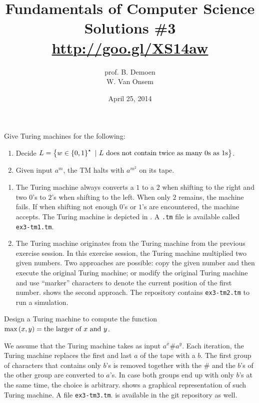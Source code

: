 \documentclass{article}
\title{Fundamentals of Computer Science\\Solutions \#3\\\url{http://goo.gl/XS14aw}}
\author{prof. B. Demoen\\W. Van Onsem}
\date{April 25, 2014}
\begin{document}
\maketitle
\begin{exercise}
Give Turing machines for the following:
\begin{enumerate}
 \item Decide $L=\left\{ w\in\left\{ 0,1 \right\}^{\star}\ |\ \mbox{$L$ does not contain twice as many $0$s as $1$s} \right\}$.
 \item Given input $a^m$, the TM halts with $a^{m^2}$ on its tape.
\end{enumerate}
\begin{answer}
\begin{enumerate}
 \item The Turing machine always converts a $1$ to a $2$ when shifting to the right and two $0$'s to $2$'s when shifting to the left. When only $2$ remains, the machine fails. If when shifting not enough $0$'s or $1$'s are encountered, the machine accepts. The Turing machine is depicted in . A \verb+.tm+ file is available called \verb+ex3-tm1.tm+.
 \item The Turing machine originates from the Turing machine from the previous exercise session. In this exercise session, the Turing machine multiplied two given numbers. Two approaches are possible: copy the given number and then execute the original Turing machine; or modify the original Turing machine and use ``marker'' characters to denote the current position of the first number.  shows the second approach. The repository contains \verb+ex3-tm2.tm+ to run a simulation.
\end{enumerate}
\end{answer}
\end{exercise}

\begin{exercise}
Design a Turing machine to compute the function $\mbox{max}\left( x,y \right)=\mbox{the larger of $x$ and $y$}$.
\begin{answer}
We assume that the Turing machine takes as input $a^x\#a^y$. Each iteration, the Turing machine replaces the first and last $a$ of the tape with a $b$. The first group of characters that contains only $b$'s is removed together with the $\#$ and the $b$'s of the other group are converted to $a$'s. In case both groups end up with only $b$'s at the same time, the choice is arbitrary.  shows a graphical representation of such Turing machine. A file \verb+ex3-tm3.tm+. is available in the git repository as well.
\end{answer}
\end{exercise}
\end{document}
